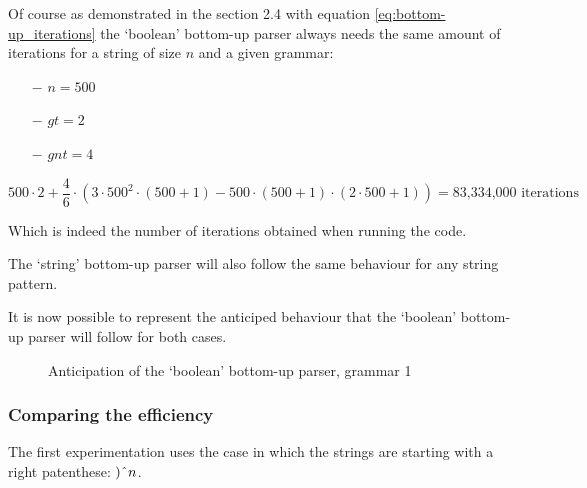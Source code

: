 Of course as demonstrated in the section 2.4 with equation \ref{eq:bottom-up_iterations} the `boolean' bottom-up parser always needs the same amount of iterations for a string of size $n$ and a given grammar:

\begin{itemize}
    \item[$-$] $n = 500$
    \item[$-$] $gt = 2$
    \item[$-$] $gnt = 4$
\end{itemize}

$$
500 \cdot 2 + \dfrac{4}{6} \cdot (3 \cdot 500^2 \cdot (500 + 1) - 500 \cdot (500 + 1) \cdot (2 \cdot 500 + 1)) = \text{83,334,000 iterations}
$$

Which is indeed the number of iterations obtained when running the code.

The `string' bottom-up parser will also follow the same behaviour for any string pattern.

It is now possible to represent the anticiped behaviour that the `boolean' bottom-up parser will follow for both cases.

\FloatBarrier
\begin{figure}[h]
\centering
{}
\caption{Anticipation of the `boolean' bottom-up parser, grammar 1}
\end{figure}
\FloatBarrier

\subsubsection{Comparing the efficiency}

The first experimentation uses the case in which the strings are starting with a right patenthese: $)\string^ n$.

